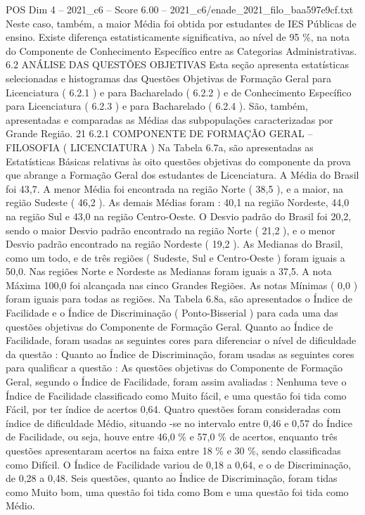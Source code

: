 \begin{textsample}{POS Dim 4 – 2021\_c6 – Score 6.00 – 2021\_c6/enade\_2021\_filo\_baa597e9cf.txt}
Neste caso, também, a maior Média foi obtida por estudantes de IES Públicas de ensino.
Existe diferença estatisticamente significativa, ao nível de 95 \%, na nota do Componente de Conhecimento Específico entre as Categorias Administrativas. 6.2 ANÁLISE DAS QUESTÕES OBJETIVAS Esta seção apresenta estatísticas selecionadas e histogramas das Questões Objetivas de Formação Geral para Licenciatura ( 6.2.1 ) e para Bacharelado ( 6.2.2 ) e de Conhecimento Específico para Licenciatura ( 6.2.3 ) e para Bacharelado ( 6.2.4 ).
São, também, apresentadas e comparadas as Médias das subpopulações caracterizadas por Grande Região. 21 6.2.1 COMPONENTE DE FORMAÇÃO GERAL – FILOSOFIA ( LICENCIATURA ) Na Tabela 6.7a, são apresentadas as Estatísticas Básicas relativas às oito questões objetivas do componente da prova que abrange a Formação Geral dos estudantes de Licenciatura.
A Média do Brasil foi 43,7.
A menor Média foi encontrada na região Norte ( 38,5 ), e a maior, na região Sudeste ( 46,2 ).
As demais Médias foram : 40,1 na região Nordeste, 44,0 na região Sul e 43,0 na região Centro-Oeste.
O Desvio padrão do Brasil foi 20,2, sendo o maior Desvio padrão encontrado na região Norte ( 21,2 ), e o menor Desvio padrão encontrado na região Nordeste ( 19,2 ).
As Medianas do Brasil, como um todo, e de três regiões ( Sudeste, Sul e Centro-Oeste ) foram iguais a 50,0.
Nas regiões Norte e Nordeste as Medianas foram iguais a 37,5.
A nota Máxima 100,0 foi alcançada nas cinco Grandes Regiões.
As notas Mínimas ( 0,0 ) foram iguais para todas as regiões.
Na Tabela 6.8a, são apresentados o Índice de Facilidade e o Índice de Discriminação ( Ponto-Bisserial ) para cada uma das questões objetivas do Componente de Formação Geral.
Quanto ao Índice de Facilidade, foram usadas as seguintes cores para diferenciar o nível de dificuldade da questão : Quanto ao Índice de Discriminação, foram usadas as seguintes cores para qualificar a questão : As questões objetivas do Componente de Formação Geral, segundo o Índice de Facilidade, foram assim avaliadas : Nenhuma teve o Índice de Facilidade classificado como Muito fácil, e uma questão foi tida como Fácil, por ter índice de acertos 0,64.
Quatro questões foram consideradas com índice de dificuldade Médio, situando -se no intervalo entre 0,46 e 0,57 do Índice de Facilidade, ou seja, houve entre 46,0 \% e 57,0 \% de acertos, enquanto três questões apresentaram acertos na faixa entre 18 \% e 30 \%, sendo classificadas como Difícil.
O Índice de Facilidade variou de 0,18 a 0,64, e o de Discriminação, de 0,28 a 0,48.
Seis questões, quanto ao Índice de Discriminação, foram tidas como Muito bom, uma questão foi tida como Bom e uma questão foi tida como Médio.

\end{textsample}
